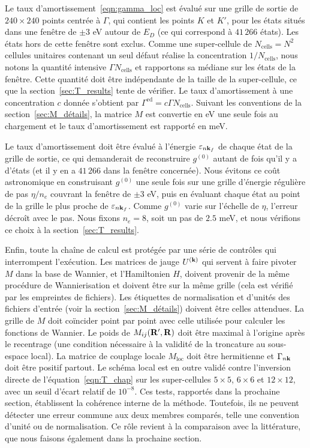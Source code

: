 Le taux d'amortissement~\eqref{eqn:gamma_loc} est évalué sur une grille de sortie de $240\times 240$ points centrée à $\Gamma$, qui contient les points $K$ et $K'$, pour les états situés dans une fenêtre de $\pm 3$ eV autour de $E_D$ (ce qui correspond à $41\,266$ états). Les états hors de cette fenêtre sont exclus. Comme une super-cellule de $N_\text{cells}=N^2$ cellules unitaires contenant un seul défaut réalise la concentration $1/N_{\text{cells}}$, nous notons la quantité intensive $\Gamma N_\text{cells}$ et rapportons sa médiane sur les états de la fenêtre. Cette quantité doit être indépendante de la taille de la super-cellule, ce que la section~\ref{sec:T_results} tente de vérifier. Le taux d'amortissement à une concentration $c$ donnée s'obtient par $\Gamma^\text{ed}=c\Gamma N_\text{cells}$. Suivant les conventions de la section~\ref{sec:M_détails}, la matrice $M$ est convertie en eV une seule fois au chargement et le taux d'amortissement est rapporté en meV.


Le taux d'amortissement doit être évalué à l'énergie $\varepsilon_{n\mathbf{k}_f}$ de chaque état de la grille de sortie, ce qui demanderait de reconstruire $g^{(0)}$ autant de fois qu'il y a d'états (et il y en a $41\,266$ dans la fenêtre concernée). Nous évitons ce coût astronomique en construisant $g^{(0)}$ une seule fois sur une grille d'énergie régulière de pas $\eta/n_e$ couvrant la fenêtre de $\pm 3$ eV, puis en évaluant chaque état au point de la grille le plus proche de $\varepsilon_{n\mathbf{k}_f}$. Comme $g^{(0)}$ varie sur l'échelle de $\eta$, l'erreur décroît avec le pas. Nous fixons $n_e=8$, soit un pas de $2.5$ meV, et nous vérifions ce choix à la section~\ref{sec:T_results}.


Enfin, toute la chaîne de calcul est protégée par une série de contrôles qui interrompent l'exécution. Les matrices de jauge $U^{(\mathbf{k})}$ qui servent à faire pivoter $M$ dans la base de Wannier, et l'Hamiltonien $H$, doivent provenir de la même procédure de Wannierisation et doivent être sur la même grille (cela est vérifié par les empreintes de fichiers). Les étiquettes de normalisation et d'unités des fichiers d'entrée (voir la section~\ref{sec:M_détails}) doivent être celles attendues. La grille de $M$ doit coïncider point par point avec celle utilisée pour calculer les fonctions de Wannier. Le poids de $M_{ij}(\mathbf{R}',\mathbf{R})$ doit être maximal à l'origine après le recentrage (une condition nécessaire à la validité de la troncature au sous-espace local). La matrice de couplage locale $M_\text{loc}$ doit être hermitienne et $\Gamma_{n\mathbf{k}}$ doit être positif partout. Le schéma local est en outre validé contre l'inversion directe de l'équation~\eqref{eqn:T_chap} sur les super-cellules $5\times 5$, $6\times 6$ et $12\times 12$, avec un seuil d'écart relatif de $10^{-8}$. Ces tests, rapportés dans la prochaine section, établissent la cohérence interne de la méthode. Toutefois, ils ne peuvent détecter une erreur commune aux deux membres comparés, telle une convention d'unité ou de normalisation. Ce rôle revient à la comparaison avec la littérature, que nous faisons également dans la prochaine section.

